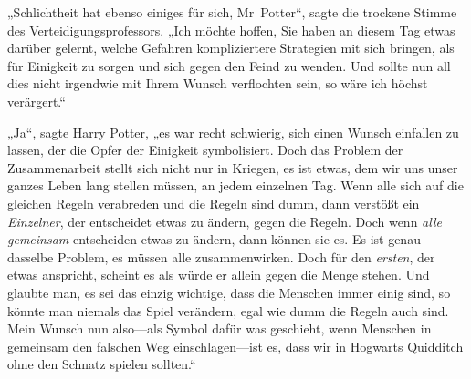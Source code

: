 „Schlichtheit hat ebenso einiges für sich, Mr~Potter“, sagte die trockene Stimme des Verteidigungsprofessors. „Ich möchte hoffen, Sie haben an diesem Tag etwas darüber gelernt, welche Gefahren kompliziertere Strategien mit sich bringen, als für Einigkeit zu sorgen und sich gegen den Feind zu wenden. Und sollte nun all dies nicht irgendwie mit Ihrem Wunsch verflochten sein, so wäre ich höchst verärgert.“

„Ja“, sagte Harry Potter, „es war recht schwierig, sich einen Wunsch einfallen zu lassen, der die Opfer der Einigkeit symbolisiert. Doch das Problem der Zusammenarbeit stellt sich nicht nur in Kriegen, es ist etwas, dem wir uns unser ganzes Leben lang stellen müssen, an jedem einzelnen Tag. Wenn alle sich auf die gleichen Regeln verabreden und die Regeln sind dumm, dann verstößt ein \emph{Einzelner}, der entscheidet etwas zu ändern, gegen die Regeln. Doch wenn \emph{alle gemeinsam} entscheiden etwas zu ändern, dann können sie es. Es ist genau dasselbe Problem, es müssen alle zusammenwirken. Doch für den \emph{ersten}, der etwas anspricht, scheint es als würde er allein gegen die Menge stehen. Und glaubte man, es sei das einzig wichtige, dass die Menschen immer einig sind, so könnte man niemals das Spiel verändern, egal wie dumm die Regeln auch sind. Mein Wunsch nun also—als Symbol dafür was geschieht, wenn Menschen in gemeinsam den falschen Weg einschlagen—ist es, dass wir in Hogwarts Quidditch ohne den Schnatz spielen sollten.“

